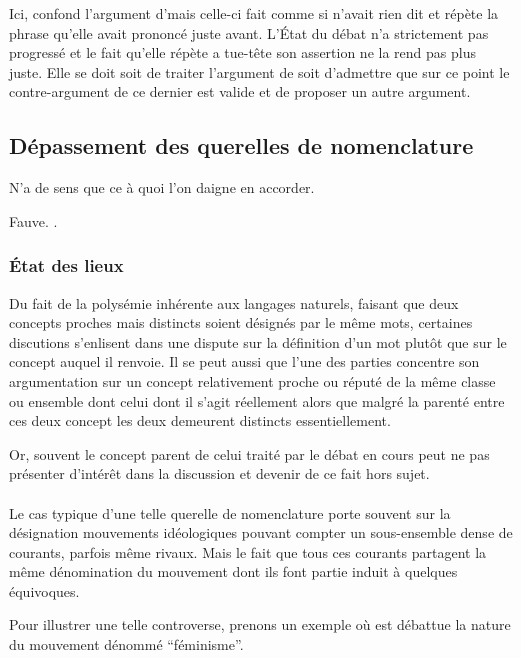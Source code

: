Ici, \B confond l’argument d’\A mais celle-ci fait comme si \B n’avait rien dit et répète la phrase qu’elle avait prononcé juste avant. L’État du débat n’a strictement pas progressé et le fait qu’elle répète a tue-tête son assertion ne la rend pas plus juste. Elle se doit soit de traiter l’argument de \B soit d’admettre que sur ce point le contre-argument de ce dernier est valide et de proposer un autre argument.

\subsection{Dépassement des querelles de nomenclature}
\epigraph{N’a de sens que ce à quoi l’on daigne en accorder.}{Fauve. .}
\subsubsection{État des lieux}
Du fait de la polysémie inhérente aux langages naturels, faisant que deux concepts proches mais distincts soient désignés par le même mots, certaines discutions s’enlisent dans une dispute sur la définition d’un mot plutôt que sur le concept auquel il renvoie. Il se peut aussi que l’une des parties concentre son argumentation sur un concept relativement proche ou réputé de la même classe ou ensemble dont celui dont il s’agit réellement alors que malgré la parenté entre ces deux concept les deux demeurent distincts essentiellement.

Or, souvent le concept parent de celui traité par le débat en cours peut ne pas présenter d’intérêt dans la discussion et devenir de ce fait hors sujet.

\paragraph{}
Le cas typique d’une telle querelle de nomenclature porte souvent sur la désignation mouvements idéologiques pouvant compter un sous-ensemble dense de courants, parfois même rivaux. Mais le fait que tous ces courants partagent la même dénomination du mouvement dont ils font partie induit à quelques équivoques.

Pour illustrer une telle controverse, prenons un exemple où est débattue la nature du mouvement dénommé \enquote{féminisme}.




